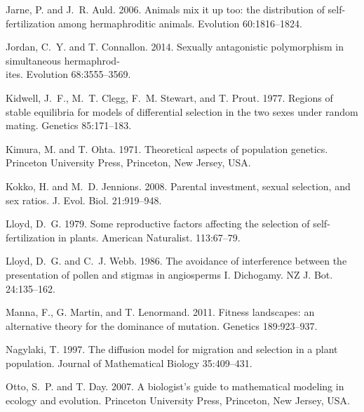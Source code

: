 \documentclass{article}
\begin{document}
\begin{thebibliography}{}
Jarne, P. and J.~R. Auld. 2006.
\newblock Animals mix it up too: the distribution of self-fertilization among hermaphroditic animals.
\newblock Evolution 60:1816--1824.

Jordan, C.~Y. and T. Connallon. 2014.
\newblock Sexually antagonistic polymorphism in simultaneous hermaphrod-\\ites.
\newblock Evolution 68:3555--3569.

Kidwell, J.~F., M.~T. Clegg, F.~M. Stewart, and T. Prout. 1977.
\newblock Regions of stable equilibria for models of differential selection in the two sexes under random mating.
\newblock Genetics 85:171--183.

Kimura, M. and T. Ohta. 1971.
\newblock Theoretical aspects of population genetics.
\newblock Princeton University Press, Princeton, New Jersey, USA.

Kokko, H. and M.~D. Jennions. 2008.
\newblock Parental investment, sexual selection, and sex ratios.
\newblock J. Evol. Biol. 21:919--948.

Lloyd, D.~G. 1979.
\newblock Some reproductive factors affecting the selection of self-fertilization in plants.
\newblock American Naturalist. 113:67--79.

Lloyd, D.~G. and C.~J. Webb. 1986.
\newblock The avoidance of interference between the presentation of pollen and stigmas in angiosperms I. Dichogamy.
\newblock NZ J. Bot. 24:135--162.

Manna, F., G. Martin, and T. Lenormand. 2011.
\newblock Fitness landscapes: an alternative theory for the dominance of mutation.
\newblock Genetics 189:923--937.

Nagylaki, T. 1997.
\newblock The diffusion model for migration and selection in a plant population.
\newblock Journal of Mathematical Biology 35:409--431.

Otto, S.~P. and T. Day. 2007.
\newblock A biologist's guide to mathematical modeling in ecology and evolution.
\newblock Princeton University Press, Princeton, New Jersey, USA.


\end{thebibliography}
\end{document}
